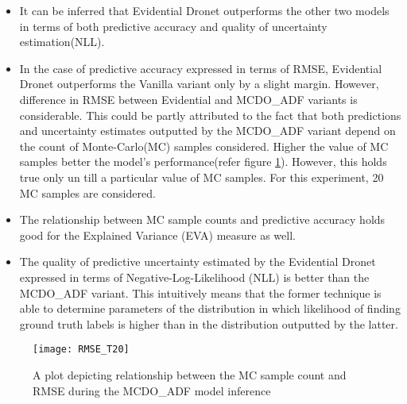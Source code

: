 \begin{itemize}
	\item It can be inferred that Evidential Dronet outperforms the other two models in terms of both predictive accuracy and quality of uncertainty estimation(NLL).
	\item In the case of predictive accuracy expressed in terms of RMSE, Evidential Dronet outperforms the Vanilla variant only by a slight margin. However, difference in RMSE between Evidential and MCDO\_ADF variants is considerable. This could be partly attributed to the fact that both predictions and uncertainty estimates outputted by the MCDO\_ADF variant depend on the count of Monte-Carlo(MC) samples considered. Higher the value of MC samples better the model's performance(refer figure \ref{fig_mc_count_vs_rmse}).  However, this holds true only un till a particular value of MC samples. For this experiment, 20 MC samples are considered. 
	\item The relationship between MC sample counts and predictive accuracy holds good for the Explained Variance (EVA) measure as well.
	\item The quality of predictive uncertainty estimated by the Evidential Dronet expressed in terms of Negative-Log-Likelihood (NLL) is better than the MCDO\_ADF variant. This intuitively means that the former technique is able to determine parameters of the distribution in which likelihood of finding ground truth labels is higher than in the distribution outputted by the latter.
\end{itemize}
\begin{figure}[H]
	\centering
	\texttt{[image: RMSE\_T20]}
	\caption{A plot depicting relationship between the MC sample count and RMSE during the MCDO\_ADF model inference}
	\label{fig_mc_count_vs_rmse}
\end{figure}
\pagebreak
